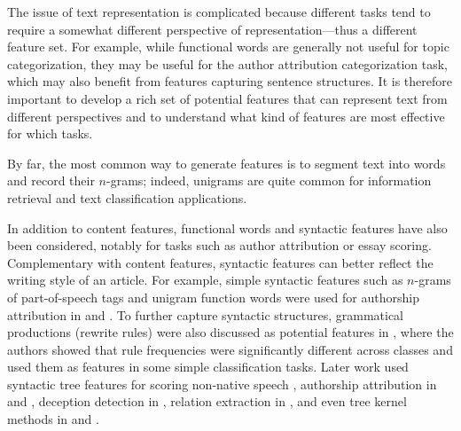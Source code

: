 \documentclass[conference]{IEEEtran}
\begin{document}
The issue of text representation is complicated because different tasks tend to
require a somewhat different perspective of representation---thus a different
feature set.  For example, while functional words are generally not useful for
topic categorization, they may be useful for the author attribution
categorization task, which may also benefit from features capturing sentence
structures.  It is therefore important to develop a rich set of potential
features that can represent text from different perspectives and to understand
what kind of features are most effective for which tasks. 
 
By far, the most common way to generate features is to segment text into words
and record their $n$-grams; indeed, unigrams are quite common for information
retrieval and text classification applications.

In addition to content features, functional words and syntactic features have
also been considered, notably for tasks such as author attribution or essay
scoring. Complementary with content features, syntactic features can better
reflect the writing style of an article.  For example,  simple syntactic
features such as $n$-grams of part-of-speech tags and unigram function words
were used for authorship attribution in \cite{jasist-stamatatos-2009} and
\cite{jasist-koppel-2009}.  To further capture syntactic structures,
grammatical productions (rewrite rules) were also discussed as potential
features in \cite{allc-baayen-1996}, where the authors showed that rule
frequencies were significantly different across classes and used them as
features in some simple classification tasks. Later work used syntactic tree
features for scoring non-native speech \cite{acl-chen-2011}, authorship
attribution in \cite{acl-raghavan-2010} and \cite{sigir-kim-2011},
deception detection in \cite{acl-feng-2012}, relation extraction in
\cite{naacl-jiang-2007}, and even tree kernel methods in
\cite{lsm-agarwal-2011} and \cite{jis-zhou-2010}.
\end{document}
